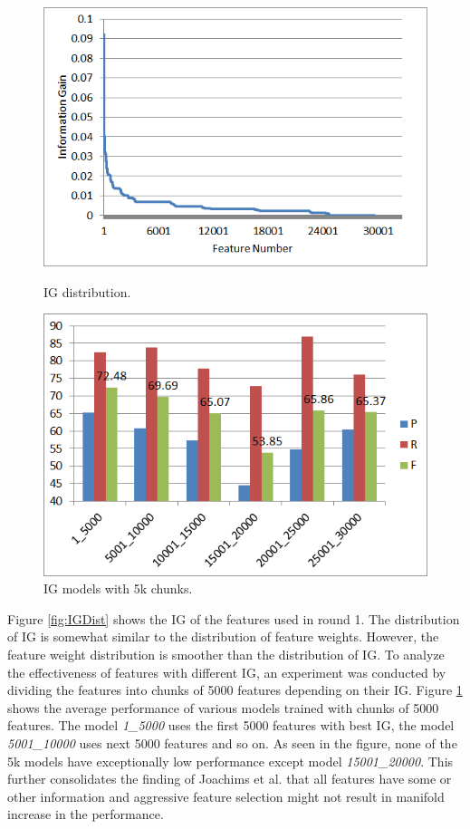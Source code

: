 \begin{figure}
\centering
\begin{minipage}{.5\textwidth}
  \centering
  \includegraphics[width=.95\textwidth]{figures/IGDistr1.png}
  \caption{IG distribution.}
  \label{fig:IGDist}
\end{minipage}%
\begin{minipage}{.5\textwidth}
  \centering
  \includegraphics[width=.95\textwidth]{figures/IG5kSlabsComp.png}
  \caption{IG models with 5k chunks.}
  \label{fig:IG5kComp}
\end{minipage}
\end{figure}

Figure \ref{fig:IGDist} shows the IG of the features used in round 1. The distribution of IG is somewhat similar to the distribution of feature weights. However, the feature weight distribution is smoother than the distribution of IG. To analyze the effectiveness of features with different IG, an experiment was conducted by dividing the features into chunks of 5000 features depending on their IG. Figure \ref{fig:IG5kComp} shows the average performance of various models trained with chunks of 5000 features. The model \textit{1\_5000} uses the first 5000 features with best IG, the model \textit{5001\_10000} uses next 5000 features and so on. As seen in the figure, none of the 5k models have exceptionally low performance except model \textit{15001\_20000}. This further consolidates the finding of Joachims et al. \cite{joachims1998text} that all features have some or other information and aggressive feature selection might not result in manifold increase in the performance.


